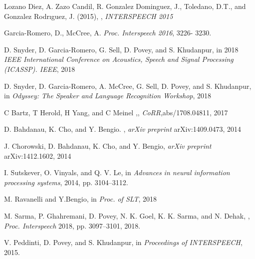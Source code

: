 \documentclass{article}
\begin{document}
\begin{thebibliography}{30}
\bibitem{}
Lozano Diez, A. Zazo Candil, R. Gonzalez Dominguez, J.,
Toledano, D.T., and Gonzalez Rodrıguez, J. (2015), , \textit{INTERSPEECH 2015}

\bibitem{}
Garcia-Romero, D., McCree, A.  \textit{Proc. Interspeech 2016}, 3226-
3230.

\bibitem{}
D. Snyder, D. Garcia-Romero, G. Sell, D. Povey, and S. Khudanpur, in 2018 \textit{IEEE International Conference on Acoustics, Speech and Signal Processing (ICASSP). IEEE}, 2018

\bibitem{}
D. Snyder, D. Garcia-Romero, A. McCree, G. Sell, D. Povey, and
S. Khudanpur,  in
\textit{Odyssey: The Speaker and Language Recognition Workshop}, 2018

\bibitem{}
C Bartz, T Herold, H Yang, and C Meinel ,, \textit{CoRR},abs/1708.04811, 2017

\bibitem{}
D. Bahdanau, K. Cho, and Y. Bengio. , \textit{arXiv preprint} arXiv:1409.0473, 2014

\bibitem{}
J. Chorowski, D. Bahdanau, K. Cho, and Y. Bengio,  \textit{arXiv preprint} arXiv:1412.1602, 2014

\bibitem{}
I. Sutskever, O. Vinyals, and Q. V. Le,  in \textit{Advances in neural information
processing systems}, 2014, pp. 3104–3112.

\bibitem{}
M. Ravanelli and Y.Bengio,  in \textit{Proc. of SLT}, 2018

\bibitem{}
M. Sarma, P. Ghahremani, D. Povey, N. K. Goel, K. K. Sarma, and
N. Dehak, , \textit{Proc. Interspeech} 2018, pp. 3097–3101, 2018.

\bibitem{}
V. Peddinti, D. Povey, and S. Khudanpur,  in \textit{Proceedings of INTERSPEECH}, 2015.


\end{thebibliography}
\end{document}
